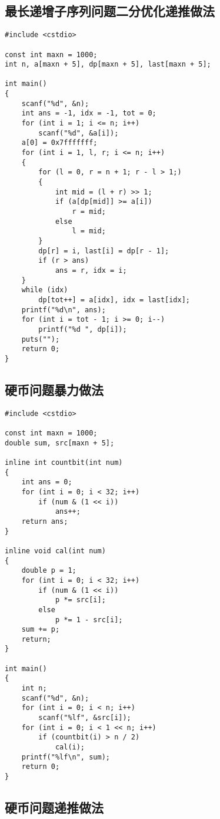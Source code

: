\documentclass{article}
\begin{document}
\subsection{最长递增子序列问题二分优化递推做法}

\begin{lstlisting}
#include <cstdio>

const int maxn = 1000;
int n, a[maxn + 5], dp[maxn + 5], last[maxn + 5];

int main()
{
    scanf("%d", &n);
    int ans = -1, idx = -1, tot = 0;
    for (int i = 1; i <= n; i++)
        scanf("%d", &a[i]);
    a[0] = 0x7fffffff;
    for (int i = 1, l, r; i <= n; i++)
    {
        for (l = 0, r = n + 1; r - l > 1;)
        {
            int mid = (l + r) >> 1;
            if (a[dp[mid]] >= a[i])
                r = mid;
            else
                l = mid;
        }
        dp[r] = i, last[i] = dp[r - 1];
        if (r > ans)
            ans = r, idx = i;
    }
    while (idx)
        dp[tot++] = a[idx], idx = last[idx];
    printf("%d\n", ans);
    for (int i = tot - 1; i >= 0; i--)
        printf("%d ", dp[i]);
    puts("");
    return 0;
}
\end{lstlisting}

\subsection{硬币问题暴力做法}

\begin{lstlisting}
#include <cstdio>

const int maxn = 1000;
double sum, src[maxn + 5];

inline int countbit(int num)
{
    int ans = 0;
    for (int i = 0; i < 32; i++)
        if (num & (1 << i))
            ans++;
    return ans;
}

inline void cal(int num)
{
    double p = 1;
    for (int i = 0; i < 32; i++)
        if (num & (1 << i))
            p *= src[i];
        else
            p *= 1 - src[i];
    sum += p;
    return;
}

int main()
{
    int n;
    scanf("%d", &n);
    for (int i = 0; i < n; i++)
        scanf("%lf", &src[i]);
    for (int i = 0; i < 1 << n; i++)
        if (countbit(i) > n / 2)
            cal(i);
    printf("%lf\n", sum);
    return 0;
}
\end{lstlisting}

\subsection{硬币问题递推做法}
\end{document}
